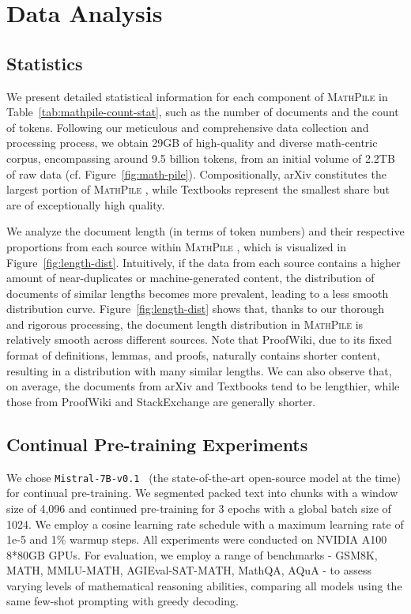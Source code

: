 \section{Data Analysis}

\subsection{Statistics}

We present detailed statistical information for each component of {\textsc{MathPile }} in Table~\ref{tab:mathpile-count-stat}, such as the number of documents and the count of tokens. Following our meticulous and comprehensive data collection and processing process, we obtain 29GB of high-quality and diverse math-centric corpus, encompassing around 9.5 billion tokens, from an initial volume of 2.2TB of raw data (cf. Figure~\ref{fig:math-pile}). Compositionally, arXiv constitutes the largest portion of {\textsc{MathPile }}, while Textbooks represent the smallest share but are of exceptionally high quality.

We analyze the document length (in terms of token numbers) and their respective proportions from each source within {\textsc{MathPile }}, which is visualized in Figure~\ref{fig:length-dist}. Intuitively, if the data from each source contains a higher amount of near-duplicates or machine-generated content, the distribution of documents of similar lengths becomes more prevalent, leading to a less smooth distribution curve. Figure~\ref{fig:length-dist} shows that, thanks to our thorough and rigorous processing, the document length distribution in {\textsc{MathPile }} is relatively smooth across different sources. Note that ProofWiki, due to its fixed format of definitions, lemmas, and proofs, naturally contains shorter content, resulting in a distribution with many similar lengths. We can also observe that, on average, the documents from arXiv and Textbooks tend to be lengthier, while those from ProofWiki and StackExchange are generally shorter.

\subsection{Continual Pre-training Experiments}
\label{sec:continual-pretrain-exp}

We chose \texttt{Mistral-7B-v0.1}~\citep{DBLP:journals/corr/abs-2310-06825-mistral-7b} (the state-of-the-art open-source model at the time) for continual pre-training. We segmented packed text into chunks with a window size of 4,096 and continued pre-training for 3 epochs with a global batch size of 1024. We employ a cosine learning rate schedule with a maximum learning rate of 1e-5 and 1\% warmup steps. All experiments were conducted on NVIDIA A100 8*80GB GPUs. For evaluation, we employ a range of benchmarks - GSM8K, MATH, MMLU-MATH, AGIEval-SAT-MATH, MathQA, AQuA - to assess varying levels of mathematical reasoning abilities, comparing all models using the same few-shot prompting with greedy decoding.


